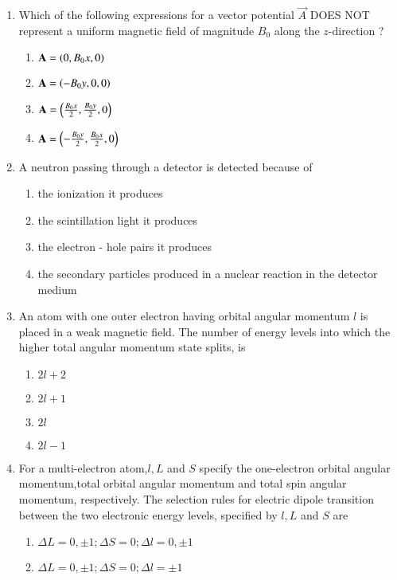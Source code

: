 \documentclass[journal,12pt,onecolumn]{IEEEtran}
\theoremstyle{remark}
\begin{document}
\begin{enumerate}[start=14]
\begin{enumerate}
        \end{enumerate}
\item Which of the following expressions for a vector potential $\vec{A}$ DOES NOT represent a uniform magnetic field of magnitude $B_0$ along the $z$-direction ?
        \begin{enumerate}
                \item $\mathbf{A}=\left(0,B_0x,0\right)$
                \item $\mathbf{A}=\left(-B_0y,0,0\right)$
                \item $\mathbf{A}=\left(\frac{B_0x}{2},\frac{B_0y}{2},0\right)$
                \item $\mathbf{A}=\left(-\frac{B_0y}{2},\frac{B_0x}{2},0\right)$
        \end{enumerate}
\item A neutron passing through a detector is detected because of
        \begin{enumerate}
\item the ionization it produces
\item the scintillation light it produces
\item the electron - hole pairs it produces
\item the secondary particles produced in a nuclear reaction in the detector medium
        \end{enumerate}
\item An atom with one outer electron having orbital angular momentum $l$ is placed in a weak magnetic field. The number of energy levels into which the higher total angular momentum state splits, is
        \begin{enumerate}
                \item $2l+2$
                \item $2l+1$
                \item $2l$
                \item $2l-1$
        \end{enumerate}
\item For a multi-electron atom,$l,L$ and $S$ specify the one-electron orbital angular momentum,total orbital angular momentum and total spin angular momentum, respectively. The selection rules for electric dipole transition between the two electronic energy levels, specified by $l,L$ and $S$ are
        \begin{enumerate}
\item $\Delta L=0,\pm1;\Delta S=0;\Delta l=0,\pm1$
\item $\Delta L=0,\pm1;\Delta S=0;\Delta l=\pm1$

\end{enumerate}
\end{enumerate}
\end{document}
